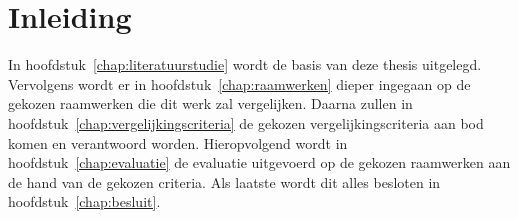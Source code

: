 \chapter{Inleiding}
\label{inleiding}


In hoofdstuk~\ref{chap:literatuurstudie} wordt de basis van deze thesis uitgelegd.
Vervolgens wordt er in hoofdstuk~\ref{chap:raamwerken} dieper ingegaan op de gekozen raamwerken die dit werk zal vergelijken.
Daarna zullen in hoofdstuk~\ref{chap:vergelijkingscriteria} de gekozen vergelijkingscriteria aan bod komen en verantwoord worden.
Hieropvolgend wordt in hoofdstuk~\ref{chap:evaluatie} de evaluatie uitgevoerd op de gekozen raamwerken aan de hand van de gekozen criteria.
Als laatste wordt dit alles besloten in hoofdstuk~\ref{chap:besluit}.

